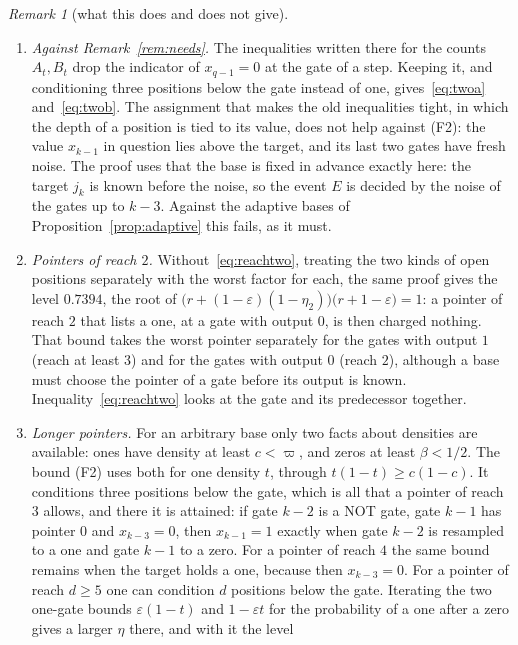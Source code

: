 \documentclass[11pt]{amsart}
\theoremstyle{definition}
\theoremstyle{remark}
\newtheorem{remark}[theorem]{Remark}
\newcommand{\eps}{\varepsilon}
\begin{document}
\begin{remark}[what this does and does not give]\label{rem:allbases}
\begin{enumerate}[label=(\roman*),leftmargin=2.4em]
\item \emph{Against Remark~\ref{rem:needs}.} The inequalities written there for the counts
$A_t,B_t$ drop the indicator of $x_{q-1}=0$ at the gate of a step. Keeping it, and conditioning
three positions below the gate instead of one, gives~\eqref{eq:twoa} and~\eqref{eq:twob}. The
assignment that makes the old inequalities tight, in which the depth of a position is tied to its
value, does not help against (F2): the value $x_{k-1}$ in question lies above the target, and its
last two gates have fresh noise. The proof uses that the base is fixed in advance exactly here:
the target $j_k$ is known before the noise, so the event $E$ is decided by the noise of the gates
up to $k-3$. Against the
adaptive bases of Proposition~\ref{prop:adaptive} this fails, as it must.
\item \emph{Pointers of reach $2$.} Without~\eqref{eq:reachtwo}, treating the two kinds of open
positions separately with the worst factor for each, the same proof gives the level $0.7394$, the
root of $\bigl(r+(1-\eps)(1-\eta_2)\bigr)\bigl(r+1-\eps\bigr)=1$: a pointer of reach $2$ that lists
a one, at a gate with output $0$, is then charged nothing. That bound takes the worst pointer
separately for the gates with output $1$ (reach at least $3$) and for the gates with output $0$
(reach $2$), although a base must choose the pointer of a gate before its output is known.
Inequality~\eqref{eq:reachtwo} looks at the gate and its predecessor together.
\item \emph{Longer pointers.} For an arbitrary base only two facts about densities are
available: ones have density at least $c<\varpi$, and zeros at least $\beta<1/2$. The bound (F2)
uses both for one density $t$, through $t(1-t)\ge c(1-c)$. It conditions three positions below
the gate, which is all that a pointer of reach $3$ allows, and there it is attained: if gate
$k-2$ is a NOT gate, gate $k-1$ has pointer $0$ and $x_{k-3}=0$, then $x_{k-1}=1$ exactly when
gate $k-2$ is resampled to a one and gate $k-1$ to a zero. For a pointer of reach $4$ the same bound
remains when the target holds a one, because then $x_{k-3}=0$. For a pointer of reach $d\ge5$ one
can condition $d$ positions below the gate. Iterating the two one-gate bounds $\eps(1-t)$ and $1-\eps t$
for the probability of a one after a zero gives a larger $\eta$ there, and with it the level

\end{enumerate}
\end{remark}
\end{document}
